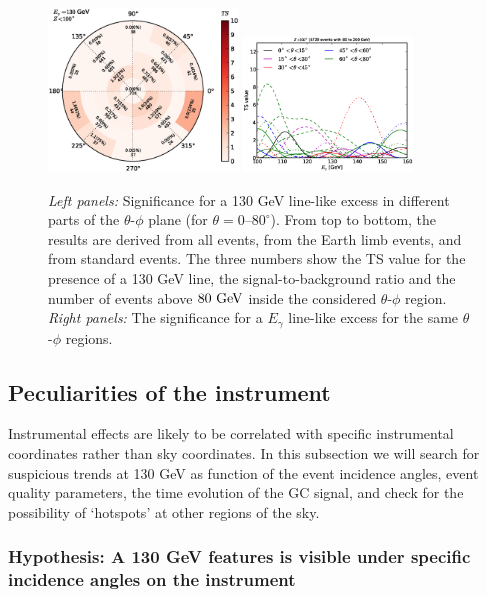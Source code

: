 \documentclass[aps,twocolumn,prd,superscriptaddress,showpacs,nofootinbib,fixfloat]{revtex4}
\newcommand{\GeV}{{\rm ~GeV}}
\begin{document}
\begin{figure}
  \includegraphics[width=0.45\textwidth]{plots/polar_z.LE.100.eps}
  \includegraphics[width=0.40\textwidth]{plots/scan_z.LE.100.eps}
  \caption{\emph{Left panels:} Significance for a 130 GeV
  line-like excess in different parts of the $\theta$-$\phi$
  plane (for $\theta=0$--$80^\circ$). From top to bottom,
  the results are derived from all events, from the Earth
  limb events, and from standard events. The three numbers
  show the TS value for the presence of a 130 GeV line, the
  signal-to-background ratio and the number of events above
  $80\GeV$ inside the considered $\theta$-$\phi$ region.
  \emph{Right panels:} The significance for a $E_\gamma$
  line-like excess for the same $\theta$-$\phi$ regions.}
  \label{fig:polarPlotsAll}
\end{figure}


\subsection{Peculiarities of the instrument}
Instrumental effects are likely to be correlated with
specific instrumental coordinates rather than sky
coordinates. In this subsection we will search for
suspicious trends at 130 GeV as function of the event
incidence angles, event quality parameters, the time
evolution of the GC signal, and check for the possibility of
`hotspots' at other regions of the sky.

\subsubsection{Hypothesis: A 130 GeV features is visible
under specific incidence angles on the instrument}
\end{document}
